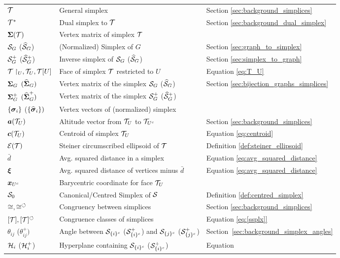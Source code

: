 \begin{longtable}{p{\colwidth}p{\descsep}l}
	{$\mathcal{T}$} & {General simplex} & Section \ref{sec:background_simplices} \\
	$\mathcal{T}^*$ & Dual simplex to $\mathcal{T}$ & Section \ref{sec:background_dual_simplex} \\
	$\boldsymbol{\Sigma}(\mathcal{T})$ & Vertex matrix of simplex $\mathcal{T}$ \\
	$\mathcal{S}_G$ ($\widehat{\mathcal{S}}_G$)  &  (Normalized) Simplex of $G$ & Section \ref{sec:graph_to_simplex} \\
	$\mathcal{S}^+_G$ ($\widehat{\mathcal{S}}^+_G$)	& Inverse simplex of $\mathcal{S}_G$ ($\widehat{\mathcal{S}}_G$) & Section \ref{sec:simplex_to_graph}\\
	{$\mathcal{T}\restriction_U, \mathcal{T}_U, \mathcal{T}[U]$} & {Face of simplex $\mathcal{T}$ restricted to $U$ } & Equation  \eqref{eq:T_U}\\ 
	{$\boldsymbol{\Sigma}_G$ $(\widehat{\boldsymbol{\Sigma}}_G)$} & Vertex matrix of the simplex $\mathcal{S}_G$ ($\widehat{\mathcal{S}}_G$) & Section \ref{sec:bijection_graphs_simplices}\\
	{$\boldsymbol{\Sigma}_G^+$ $(\widehat{\boldsymbol{\Sigma}}_G^+)$} & Vertex matrix of the simplex $\mathcal{S}_G^+$ ($\widehat{\mathcal{S}}_G^+$) \\
	{$\{\vb*{\sigma}_i\}$ ($\{\widehat{\vb*{\sigma}}_i\})$} & {Vertex vectors of (normalized) simplex}\\
	{$\vb*{a}(\mathcal{T}_U)$} & {Altitude vector from $\mathcal{T}_U$ to $\mathcal{T}_{U^c}$} & Section \ref{sec:background_simplices}\\
	{$\vb*{c}(\mathcal{T}_U)$} & {Centroid of simplex $\mathcal{T}_U$} & Equation \eqref{eq:centroid} \\
	$\mathcal{E}(\mathcal{T})$ & Steiner circumscribed ellipsoid  of $\mathcal{T}$ & Definition \ref{def:steiner_ellipsoid}\\
	$\bar{d}$ & Avg. squared distance in a simplex & Equation \eqref{eq:avg_squared_distance}\\
	$\vb*{\xi}$ & Avg. squared distance of vertices minus $\bar{d}$ & Equation \eqref{eq:avg_squared_distance}\\
	$\vb*{x}_{U^c}$ & Barycentric coordinate for face $\mathcal{T}_U$ & \\
	$\mathcal{S}_0$ & Canonical/Centred Simplex of $\mathcal{S}$ & Definition \ref{def:centred_simplex} \\
	$\cong,\cong^\circlearrowleft$ & Congruency between simplices & Section \ref{sec:background_simplices} \\
	$[\mathcal{T}],[\mathcal{T}]^\circlearrowleft$ & Congruence classes of simplices & Equation \eqref{eq:[ssplx]}\\
	$\theta_{ij}$ ($\theta_{ij}^+)$ & Angle between $\mathcal{S}_{\{i\}^c}$ ($\mathcal{S}_{\{i\}^c}^+$) and $\mathcal{S}_{\{j\}^c}$  ($\mathcal{S}_{\{j\}^c}^+$) & Section~\ref{sec:background_simplex_angles} \\
	$\mathcal{H}_i$ ($\mathcal{H}_i^+$) & Hyperplane containing $\mathcal{S}_{\{i\}^c}$ ($\mathcal{S}_{\{i\}^c}^+$) & Equation\todo 
\end{longtable}
\vspace{\groupsep}

